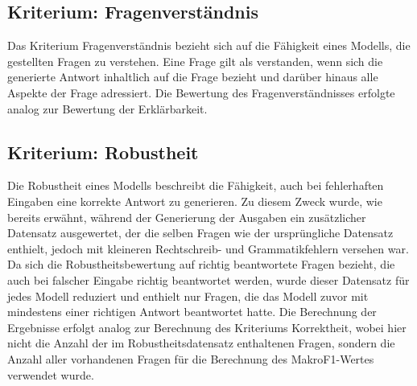 \subsection{Kriterium: Fragenverständnis}
Das Kriterium Fragenverständnis bezieht sich auf die Fähigkeit eines Modells, die gestellten Fragen zu verstehen.
Eine Frage gilt als verstanden, wenn sich die generierte Antwort inhaltlich auf die Frage bezieht und darüber hinaus alle Aspekte der Frage adressiert.
Die Bewertung des Fragenverständnisses erfolgte analog zur Bewertung der Erklärbarkeit.

\subsection{Kriterium: Robustheit}
Die Robustheit eines Modells beschreibt die Fähigkeit, auch bei fehlerhaften Eingaben eine korrekte Antwort zu generieren.
Zu diesem Zweck wurde, wie bereits erwähnt, während der Generierung der Ausgaben ein zusätzlicher Datensatz ausgewertet, der die selben Fragen wie der ursprüngliche Datensatz enthielt, jedoch mit kleineren Rechtschreib- und Grammatikfehlern versehen war.
Da sich die Robustheitsbewertung auf richtig beantwortete Fragen bezieht, die auch bei falscher Eingabe richtig beantwortet werden, wurde dieser Datensatz für jedes Modell reduziert und enthielt nur Fragen, die das Modell zuvor mit mindestens einer richtigen Antwort beantwortet hatte.
Die Berechnung der Ergebnisse erfolgt analog zur Berechnung des Kriteriums Korrektheit, wobei hier nicht die Anzahl der im Robustheitsdatensatz enthaltenen Fragen, sondern die Anzahl aller vorhandenen Fragen für die Berechnung des MakroF1-Wertes verwendet wurde.
